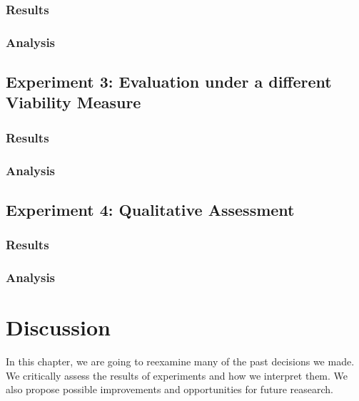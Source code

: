 \documentclass[12pt,a4paper]{report}
\begin{document}
\subsection{Results}


\subsection{Analysis}




\section{Experiment 3: Evaluation under a different Viability Measure}
\label{sec:experiment3}
\subsection{Results}

\subsection{Analysis}


\section{Experiment 4: Qualitative Assessment}
\label{sec:experiment4}
\subsection{Results}

\subsection{Analysis}



\chapter{Discussion}
\label{ch:discussion}
In this chapter, we are going to reexamine many of the past decisions we made. We critically assess the results of experiments and how we interpret them. We also propose possible improvements and opportunities for future reasearch.
\end{document}
